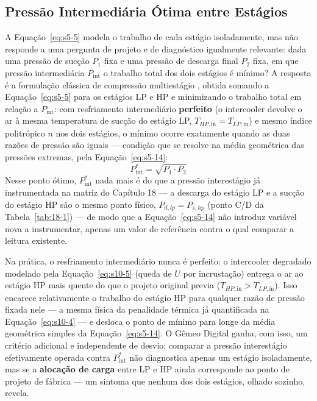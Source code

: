 \documentclass[12pt,a4paper]{article}
\numberwithin{equation}{section}
\numberwithin{table}{section}
\numberwithin{figure}{section}
\begin{document}
{	\subsection{\textbf{Pressão Intermediária Ótima entre Estágios}}
	A Equação~\eqref{eq:s5-5} modela o trabalho de cada estágio isoladamente, mas não responde a uma pergunta de projeto e de diagnóstico igualmente relevante: dada uma pressão de sucção $P_1$ fixa e uma pressão de descarga final $P_2$ fixa, em que pressão intermediária $P_{\text{int}}$ o trabalho total dos dois estágios é mínimo? A resposta é a formulação clássica de compressão multiestágio \cite{cengel, moran, hanlon}, obtida somando a Equação~\eqref{eq:s5-5} para os estágios LP e HP e minimizando o trabalho total em relação a $P_{\text{int}}$: com resfriamento intermediário \textbf{perfeito} (o intercooler devolve o ar à mesma temperatura de sucção do estágio LP, $T_{HP,\text{in}} = T_{LP,\text{in}}$) e mesmo índice politrópico $n$ nos dois estágios, o mínimo ocorre exatamente quando as duas razões de pressão são iguais — condição que se resolve na média geométrica das pressões extremas, pela Equação~\eqref{eq:s5-14}:
	\begin{equation}\label{eq:s5-14}
 P_{\text{int}}^{*} = \sqrt{P_1 \cdot P_2}
\end{equation}
	Nesse ponto ótimo, $P_{\text{int}}^{*}$ nada mais é do que a pressão interestágio já instrumentada na matriz do Capítulo 18 — a descarga do estágio LP e a sucção do estágio HP são o mesmo ponto físico, $P_{d,lp} = P_{s,hp}$ (ponto C/D da Tabela~\ref{tab:18-1}) — de modo que a Equação~\eqref{eq:s5-14} não introduz variável nova a instrumentar, apenas um valor de referência contra o qual comparar a leitura existente.

	Na prática, o resfriamento intermediário nunca é perfeito: o intercooler degradado modelado pela Equação~\eqref{eq:s10-5} (queda de $U$ por incrustação) entrega o ar ao estágio HP mais quente do que o projeto original previa ($T_{HP,\text{in}} > T_{LP,\text{in}}$). Isso encarece relativamente o trabalho do estágio HP para qualquer razão de pressão fixada nele — a mesma física da penalidade térmica já quantificada na Equação~\eqref{eq:s10-4} — e desloca o ponto de mínimo para longe da média geométrica simples da Equação~\eqref{eq:s5-14}. O Gêmeo Digital ganha, com isso, um critério adicional e independente de desvio: comparar a pressão interestágio efetivamente operada contra $P_{\text{int}}^{*}$ não diagnostica apenas um estágio isoladamente, mas se a \textbf{alocação de carga} entre LP e HP ainda corresponde ao ponto de projeto de fábrica — um sintoma que nenhum dos dois estágios, olhado sozinho, revela.

}
\end{document}
